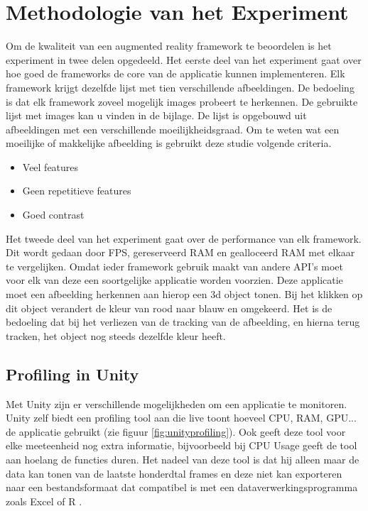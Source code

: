 
\chapter{Methodologie van het Experiment}
\label{ch:methodologie}

Om de kwaliteit van een augmented reality framework te beoordelen is het experiment in twee delen opgedeeld. Het eerste deel van het experiment gaat over hoe goed de frameworks de core van de applicatie kunnen implementeren. Elk framework krijgt dezelfde lijst met tien verschillende afbeeldingen. De bedoeling is dat elk framework zoveel mogelijk images probeert te herkennen. De gebruikte lijst met images kan u vinden in de bijlage. De lijst is opgebouwd uit afbeeldingen met een verschillende moeilijkheidsgraad. Om te weten wat een moeilijke of makkelijke afbeelding is gebruikt deze studie volgende criteria.

\begin{itemize}
    \item Veel features
    \item Geen repetitieve features
    \item Goed contrast
\end{itemize} 


Het tweede deel van het experiment gaat over de performance van elk framework. Dit wordt gedaan door FPS, gereserveerd RAM en gealloceerd RAM met elkaar te vergelijken. Omdat ieder framework gebruik maakt van andere API's moet voor elk van deze een soortgelijke applicatie worden voorzien. Deze applicatie moet een afbeelding herkennen aan hierop een 3d object tonen. Bij het klikken op dit object verandert de kleur van rood naar blauw en omgekeerd. Het is de bedoeling dat bij het verliezen van de tracking van de afbeelding, en hierna terug tracken, het object nog steeds dezelfde kleur heeft.

\section{Profiling in Unity}
Met Unity zijn er verschillende mogelijkheden om een applicatie te monitoren. Unity zelf biedt een profiling tool aan die live toont hoeveel CPU, RAM, GPU... de applicatie gebruikt (zie figuur \ref{fig:unityprofiling}). Ook geeft deze tool voor elke meeteenheid nog extra informatie, bijvoorbeeld bij CPU Usage geeft de tool aan hoelang de functies duren. Het nadeel van deze tool is dat hij alleen maar de data kan tonen van de laatste honderdtal frames en deze niet kan exporteren naar een bestandsformaat dat compatibel is met een dataverwerkingsprogramma zoals Excel of R \autocite{UnityProfiling}.

